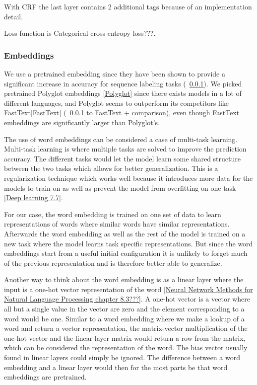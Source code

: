 With CRF the last layer contains 2 additional tags because of an implementation
detail. 

Loss function is Categorical cross entropy loss???.

\subsubsection{Embeddings}

We use a pretrained embedding since they have been shown to provide a
significant increase in accuracy for sequence labeling tasks (~\ref{}). We
picked pretrained Polyglot embeddings \ref{Polyglot} since there exists models
in a lot of different languages, and Polyglot seems to outperform its
competitors like FastText\ref{FastText} (~\ref{} to FastText + comparison), even though
FastText embeddings are significantly larger than Polyglot's.

The use of word embeddings can be considered a case of multi-task learning.
Multi-task learning is where multiple tasks are solved to improve the prediction
accuracy. The different tasks would let the model learn some shared structure
between the two tasks which allows for better generalization. This is a
regularization technique which works well because it introduces more data for
the models to train on as well as prevent the model from overfitting on one task
\ref{Deep learning 7.7}. 

For our case, the word embedding is trained on one set of data to learn
representations of words where similar words have similar representations.
Afterwards the word embedding as well as the rest of the model is trained on a
new task where the model learns task specific representations. But since the
word embeddings start from a useful initial configuration it is unlikely to
forget much of the previous representation and is therefore better able to
generalize.

Another way to think about the word embedding is as a linear layer where the
input is a one-hot vector representation of the word \ref{Neural Network Methods
for Natural Language Processing chapter 8.3???}. A one-hot vector is a vector
where all but a single value in the vector are zero and the element
corresponding to a word would be one. Similar to a word embedding where we make
a lookup of a word and return a vector representation, the matrix-vector
multiplication of the one-hot vector and the linear layer matrix would return a
row from the matrix, which can be considered the representation of the word. The
bias vector usually found in linear layers could simply be ignored. The
difference between a word embedding and a linear layer would then for the most
parts be that word embeddings are pretrained.

